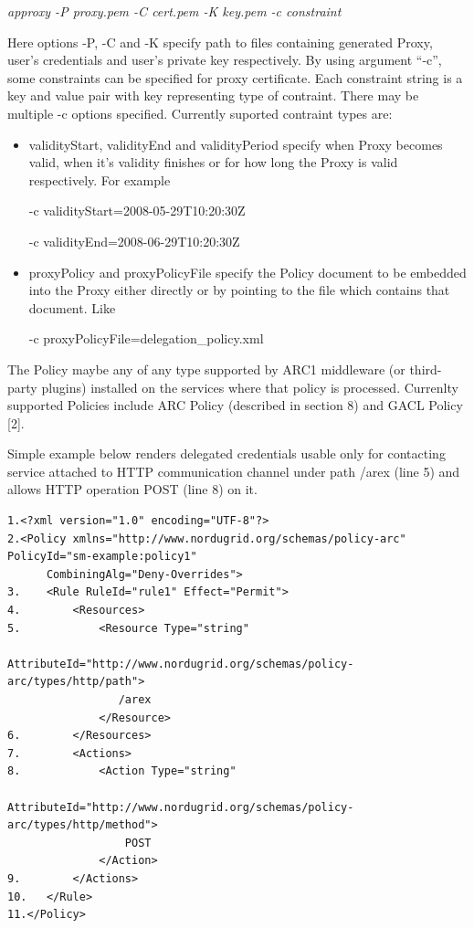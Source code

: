 \documentclass{article}                            %
\begin{document}
\emph{approxy -P proxy.pem -C cert.pem -K key.pem -c constraint}

Here options -P, -C and -K specify path to files containing generated Proxy, user's credentials and user's private key respectively. By using argument ``-c'', some constraints can be specified for proxy certificate. Each constraint string is a key and value pair with key representing type of contraint. There may be multiple -c options specified.  Currently suported contraint types are:

    \begin{itemize}
        \item validityStart, validityEnd and validityPeriod  specify when Proxy becomes valid, when it's validity finishes or for how long the Proxy is valid respectively. For example

-c validityStart=2008-05-29T10:20:30Z

-c validityEnd=2008-06-29T10:20:30Z

        \item proxyPolicy and proxyPolicyFile specify the Policy document to be embedded into the Proxy either directly or by pointing to the file which contains that document. Like

-c proxyPolicyFile=delegation\_policy.xml
    \end{itemize}

The Policy maybe any of any type supported by ARC1 middleware (or third-party plugins) installed on the services where that policy is processed. Currenlty supported Policies include ARC Policy (described in section 8) and GACL Policy [2].

Simple example below renders delegated credentials usable only for contacting service attached to HTTP communication channel under path /arex (line 5)  and allows HTTP operation POST (line 8) on it.

\begin{verbatim}
1.<?xml version="1.0" encoding="UTF-8"?>
2.<Policy xmlns="http://www.nordugrid.org/schemas/policy-arc" PolicyId="sm-example:policy1"
      CombiningAlg="Deny-Overrides">
3.    <Rule RuleId="rule1" Effect="Permit">
4.        <Resources>
5.            <Resource Type="string"
                  AttributeId="http://www.nordugrid.org/schemas/policy-arc/types/http/path">
                 /arex
              </Resource>
6.        </Resources>
7.        <Actions>
8.            <Action Type="string"
                  AttributeId="http://www.nordugrid.org/schemas/policy-arc/types/http/method">
                  POST
              </Action>
9.        </Actions>
10.   </Rule>
11.</Policy>
\end{verbatim}
\end{document}
